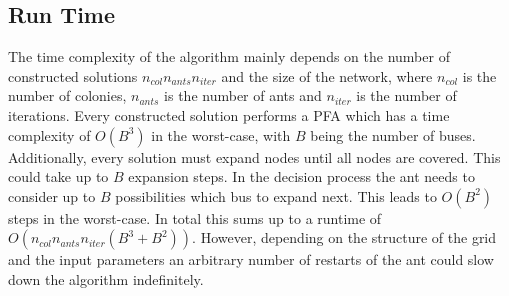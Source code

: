 \subsection{Run Time}
The time complexity of the algorithm mainly depends on the number of constructed solutions $n_{col} n_{ants} n_{iter}$ and the size of the network, where $n_{col}$ is the number of colonies, $n_{ants}$ is the number of ants and $n_{iter}$ is the number of iterations. Every constructed solution performs a PFA which has a time complexity of $O(B^3)$ in the worst-case, with $B$ being the number of buses. Additionally, every solution must expand nodes until all nodes are covered. This could take up to $B$ expansion steps. In the decision process the ant needs to consider up to $B$ possibilities which bus to expand next. This leads to $O(B^2)$ steps in the worst-case. In total this sums up to a runtime of $O(n_{col} n_{ants} n_{iter} (B^3+B^2))$. However, depending on the structure of the grid and the input parameters an arbitrary number of restarts of the ant could slow down the algorithm indefinitely.




